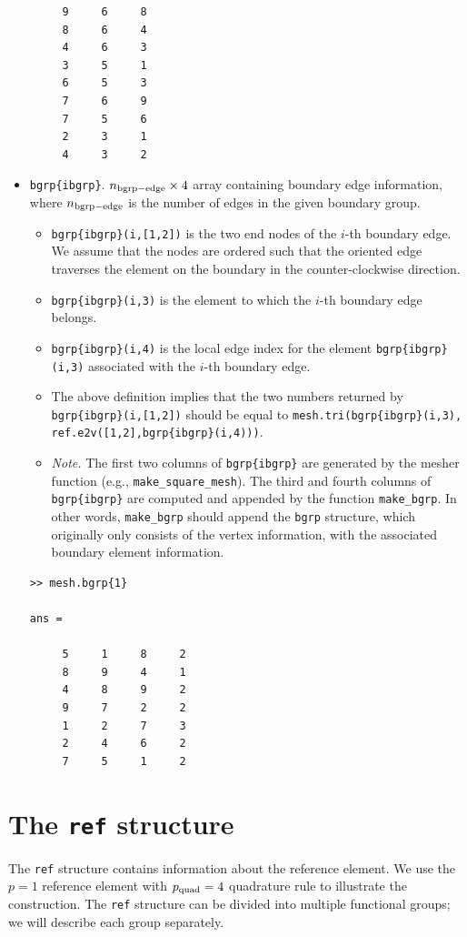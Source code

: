 \documentclass[openany,preprint,11pt]{article}
\begin{document}
\begin{itemize}
\begin{verbatim}
     9     6     8
     8     6     4
     4     6     3
     3     5     1
     6     5     3
     7     6     9
     7     5     6
     2     3     1
     4     3     2
\end{verbatim}
\item \texttt{bgrp\{ibgrp\}}. $n_{\rm bgrp-edge} \times 4$ array containing boundary edge information, where $n_{\rm bgrp-edge}$ is the number of edges in the given boundary group.
  \begin{itemize}
  \item \texttt{bgrp\{ibgrp\}(i,[1,2])} is the two end nodes of the $i$-th boundary edge. We assume that the nodes are ordered such that the oriented edge traverses the element on the boundary in the counter-clockwise direction.
  \item \texttt{bgrp\{ibgrp\}(i,3)} is the element to which the $i$-th boundary edge belongs.
  \item \texttt{bgrp\{ibgrp\}(i,4)} is the local edge index for the element \texttt{bgrp\{ibgrp\}(i,3)} associated with the $i$-th boundary edge.
  \item The above definition implies that the two numbers returned by \texttt{bgrp\{ibgrp\}(i,[1,2])} should be equal to \texttt{mesh.tri(bgrp\{ibgrp\}(i,3), ref.e2v([1,2],bgrp\{ibgrp\}(i,4)))}.
  \item \emph{Note.} The first two columns of \texttt{bgrp\{ibgrp\}} are generated by the mesher function (e.g., \texttt{make\_square\_mesh}).  The third and fourth columns of \texttt{bgrp\{ibgrp\}} are computed and appended by the function \texttt{make\_bgrp}. In other words, \texttt{make\_bgrp} should append the \texttt{bgrp} structure, which originally only consists of the vertex information, with the associated boundary element information.
  \end{itemize}
\begin{verbatim}
>> mesh.bgrp{1}
   
ans =

     5     1     8     2
     8     9     4     1
     4     8     9     2
     9     7     2     2
     1     2     7     3
     2     4     6     2
     7     5     1     2
\end{verbatim}
\end{itemize}

\section{The \texttt{ref} structure}
The \texttt{ref} structure contains information about the reference element.  We use the $p=1$ reference element with $p_{\rm quad} = 4$ quadrature rule to illustrate the construction.  The \texttt{ref} structure can be divided into multiple functional groups; we will describe each group separately.
\end{document}
